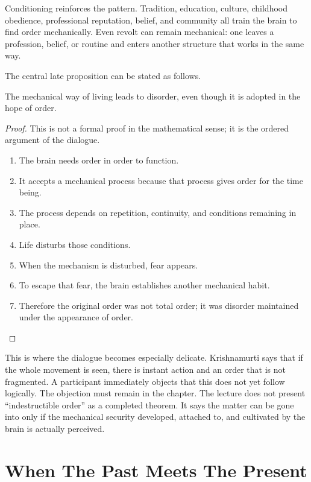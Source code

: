 Conditioning reinforces the pattern. Tradition, education, culture, childhood obedience, professional reputation, belief, and community all train the brain to find order mechanically. Even revolt can remain mechanical: one leaves a profession, belief, or routine and enters another structure that works in the same way.

The central late proposition can be stated as follows.

\begin{proposition}
The mechanical way of living leads to disorder, even though it is adopted in the hope of order.
\end{proposition}

\begin{proof}
This is not a formal proof in the mathematical sense; it is the ordered argument of the dialogue.
\begin{enumerate}
\item The brain needs order in order to function.
\item It accepts a mechanical process because that process gives order for the time being.
\item The process depends on repetition, continuity, and conditions remaining in place.
\item Life disturbs those conditions.
\item When the mechanism is disturbed, fear appears.
\item To escape that fear, the brain establishes another mechanical habit.
\item Therefore the original order was not total order; it was disorder maintained under the appearance of order.
\end{enumerate}
\end{proof}

This is where the dialogue becomes especially delicate. Krishnamurti says that if the whole movement is seen, there is instant action and an order that is not fragmented. A participant immediately objects that this does not yet follow logically. The objection must remain in the chapter. The lecture does not present ``indestructible order'' as a completed theorem. It says the matter can be gone into only if the mechanical security developed, attached to, and cultivated by the brain is actually perceived.

\section{When The Past Meets The Present}

